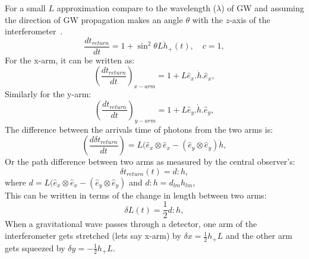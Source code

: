 \documentclass{ttuthes2007}
\begin{document}
For a small $L$ approximation compare to the wavelength ($\lambda$) of \ac{GW}
and assuming the
direction of \ac{GW} propagation makes an angle $\theta$ with the $z$-axis of
the interferometer~\cite{Sathyaprakash_2009}.
\begin{equation}
\frac{dt_{return}}{dt} =1+\sin^2{\theta} L \dot{h}_+ (t), \quad c=1, 
\end{equation}
For the x-arm, it can be written as:
\begin{equation}
\left(\frac{dt_{return}}{dt}\right)_{x-arm}=1+L\hat{e}_x.\dot{h}.\hat{e}_x,
\end{equation}
Similarly for the y-arm:
\begin{equation}                                                                
\left(\frac{dt_{return}}{dt}\right)_{y-arm}=1+L\hat{e}_y.\dot{h}.\hat{e}_y,  
\end{equation}  
The difference between the arrivals time of photons from the two arms is:
\begin{equation}
\left(\frac{d\delta
t_{return}}{dt}\right)=L(\hat{e}_x\otimes\hat{e}_x-(\hat{e}_y\otimes\hat{e}_y)\dot{h},
\end{equation}
Or the path difference between two arms as measured by the central observer's:
\begin{equation}
\delta t_{return}(t)=d:h,
\end{equation}
where $d=L(\hat{e}_x\otimes\hat{e}_x-(\hat{e}_y\otimes\hat{e}_y)$ and 
$d:h=d_{lm}h_{lm}$,
\\
This can be written in terms of the change in length between two arms:
\begin{equation}
\delta L(t)=\frac{1}{2}d:h,
\end{equation}
When a gravitational wave passes through a detector, one arm of the
interferometer gets stretched (lets say x-arm) by $\delta x=\frac{1}{2}h_+L$ and
the other arm gets squeezed by $\delta y=-\frac{1}{2}h_+L$.    
\end{document}
